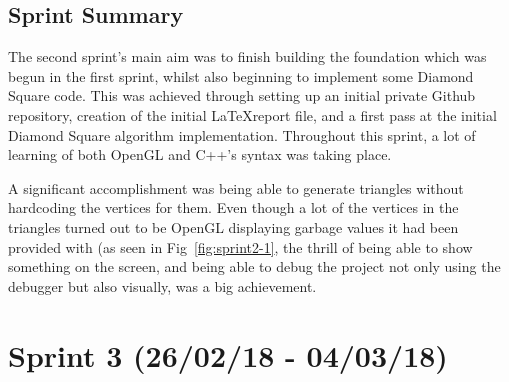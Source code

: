 \documentclass[a4paper,10pt]{report}
\begin{document}
\subsection{Sprint Summary}

The second sprint's main aim was to finish building the foundation which was begun in the first sprint, whilst also beginning to implement some Diamond Square code. This was achieved through setting up an initial private Github repository, creation of the initial \LaTeX report file, and a first pass at the initial Diamond Square algorithm implementation. Throughout this sprint, a lot of learning of both OpenGL and C++'s syntax was taking place.  \medskip

A significant accomplishment was being able to generate triangles without hardcoding the vertices for them. Even though a lot of the vertices in the triangles turned out to be OpenGL displaying garbage values it had been provided with (as seen in Fig~\ref{fig:sprint2-1}, the thrill of being able to show something on the screen, and being able to debug the project not only using the debugger but also visually, was a big achievement. 

\clearpage

\section{Sprint 3 (26/02/18 - 04/03/18)}
\end{document}
